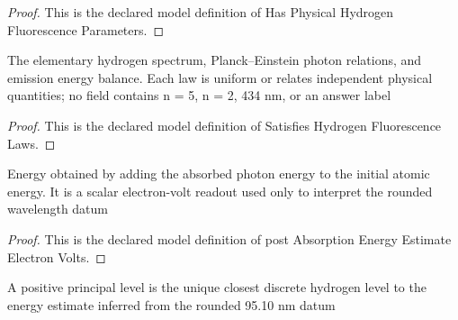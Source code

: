 \begin{proof}
  This is the declared model definition of Has Physical Hydrogen Fluorescence Parameters.
\end{proof}
\begin{definition}
  \label{def:physics:phyx-mini-0637:phyxminiproblems-problemphyxmini0637-satisfieshydrogenfluorescencelaws}
  The elementary hydrogen spectrum, Planck--Einstein photon relations, and emission energy balance. Each law is uniform or relates independent physical quantities; no field contains n = 5, n = 2, 434 nm, or an answer label
\end{definition}
\begin{proof}
  This is the declared model definition of Satisfies Hydrogen Fluorescence Laws.
\end{proof}
\begin{definition}
  \label{def:physics:phyx-mini-0637:phyxminiproblems-problemphyxmini0637-postabsorptionenergyestimateelectronvolts}
  Energy obtained by adding the absorbed photon energy to the initial atomic energy. It is a scalar electron-volt readout used only to interpret the rounded wavelength datum
\end{definition}
\begin{proof}
  This is the declared model definition of post Absorption Energy Estimate Electron Volts.
\end{proof}
\begin{definition}
  \label{def:physics:phyx-mini-0637:phyxminiproblems-problemphyxmini0637-isuniqueclosestpostabsorptionlevel}
  A positive principal level is the unique closest discrete hydrogen level to the energy estimate inferred from the rounded 95.10 nm datum
\end{definition}
